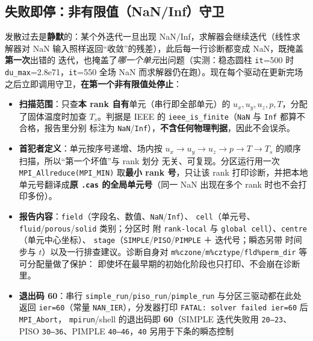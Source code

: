 \documentclass[11pt,a4paper]{ctexart}
\begin{document}
\subsection{失败即停：非有限值（NaN/Inf）守卫}\label{sec:nanguard}

发散过去是\textbf{静默}的：某个外迭代一旦出现 NaN/Inf，求解器会继续迭代（线性求解器对
NaN 输入照样返回``收敛''的残差），此后每一行诊断都变成 NaN，既掩盖\textbf{第一次}出错的
迭代，也掩盖了\emph{哪一个单元}出问题（实测：稳态圆柱 \texttt{it}=500 时
\texttt{du\_max}=2.8e71，\texttt{it}=550 全场 NaN 而求解器仍在跑）。现在每个驱动在更新完场
之后立即调用守卫，\textbf{在第一个非有限值处停止}：

\begin{itemize}\itemsep2pt
  \item \textbf{扫描范围}：只查\textbf{本 rank 自有}单元（串行即全部单元）的
        $u_x,u_y,u_z,p,T$，分配了固体温度时加查 $T_s$。判据是 IEEE 的
        \texttt{ieee\_is\_finite}（\texttt{NaN} 与 \texttt{Inf} 都算不合格，报告里分别
        标注为 \texttt{NaN}/\texttt{Inf}），\textbf{不含任何物理判据}，因此不会误杀。
  \item \textbf{首犯者定义}：单元按序号递增、场内按
        $u_x\to u_y\to u_z\to p\to T\to T_s$ 的顺序扫描，所以``第一个坏值''与 rank 划分
        无关、可复现。分区运行用一次 \texttt{MPI\_Allreduce(MPI\_MIN)} 取\textbf{最小
        rank 号}，只让该 rank 打印诊断，并把本地单元号翻译成\textbf{原 \texttt{.cas}
        的全局单元号}（同一 NaN 出现在多个 rank 时也不会打印多份）。
  \item \textbf{报告内容}：\texttt{field}（字段名、数值、\texttt{NaN}/\texttt{Inf}）、
        \texttt{cell}（单元号、\texttt{fluid}/\texttt{porous}/\texttt{solid} 类别；分区时
        附 \texttt{rank-local} 与 \texttt{global cell}）、\texttt{centre}（单元中心坐标）、
        \texttt{stage}（\texttt{SIMPLE}/\texttt{PISO}/\texttt{PIMPLE} ＋ 迭代号；瞬态另带
        时间步与 $t$）以及一行排查建议。诊断自身对
        \texttt{m\%czone}/\texttt{m\%cztype}/\texttt{fld\%perm\_dir} 等可分配量做了保护：
        即使坏在最早期的初始化阶段也只打印、不会崩在诊断里。
  \item \textbf{退出码 60}：串行 \texttt{simple\_run}/\texttt{piso\_run}/\texttt{pimple\_run}
        与分区三驱动都在此处返回 \texttt{ier=60}（常量 \texttt{NAN\_IER}），分发器打印
        \texttt{FATAL: solver failed ier=60} 后 \texttt{MPI\_Abort}，
        \texttt{mpirun}/shell 的退出码即 \textbf{60}（SIMPLE 迭代失败用 \texttt{20--23}、
        PISO \texttt{30--36}、PIMPLE \texttt{40--46}，\texttt{40} 另用于下条的瞬态控制

\end{itemize}
\end{document}
